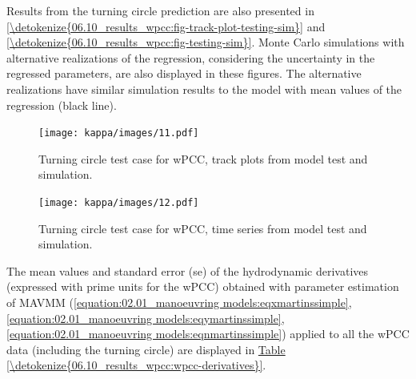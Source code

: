 
Results from the turning circle prediction are also presented in  \autoref{\detokenize{06.10_results_wpcc:fig-track-plot-testing-sim}} and  \autoref{\detokenize{06.10_results_wpcc:fig-testing-sim}}. Monte Carlo simulations with alternative realizations of the regression, considering the uncertainty in the regressed parameters, are also displayed in these figures. The alternative realizations have similar simulation results to the model with mean values of the regression (black line).
\begin{figure}[ht]
\centering
\texttt{[image: kappa/images/11.pdf]}
\caption{Turning circle test case for wPCC, track plots from model test and simulation.}\label{\detokenize{06.10_results_wpcc:fig-track-plot-testing-sim}}\end{figure}
\begin{figure}[ht!]
\centering
\texttt{[image: kappa/images/12.pdf]}
\caption{Turning circle test case for wPCC, time series from model test and simulation.}\label{\detokenize{06.10_results_wpcc:fig-testing-sim}}\end{figure}
\clearpage
\noindent The mean values and standard error (se) of the hydrodynamic derivatives (expressed with prime units for the wPCC) obtained with parameter estimation of MAVMM (\autoref{equation:02.01_manoeuvring models:eqxmartinssimple}, \autoref{equation:02.01_manoeuvring models:eqymartinssimple},  \autoref{equation:02.01_manoeuvring models:eqnmartinssimple}) applied to all the wPCC data (including the turning circle)  are displayed in \hyperref[\detokenize{06.10_results_wpcc:wpcc-derivatives}]{Table \ref{\detokenize{06.10_results_wpcc:wpcc-derivatives}}}.

\clearpage
